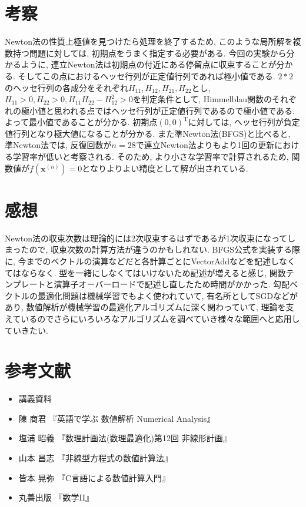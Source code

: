 \documentclass[12pt,a4paper]{jsarticle}
\begin{document}


\section{考察}
Newton法の性質上極値を見つけたら処理を終了するため, このような局所解を複数持つ問題に対しては, 初期点をうまく指定する必要がある. 今回の実験から分かるように, 連立Newton法は初期点の付近にある停留点に収束することが分かる. そしてこの点におけるヘッセ行列が正定値行列であれば極小値である. $2*2$のヘッセ行列の各成分をそれぞれ$H_{11}, H_{12}, H_{21}, H_{22}$とし, $H_{11} > 0, H_{22} > 0, H_{11}H_{22} - H_{12}^2 > 0$を判定条件として, Himmelblau関数のそれぞれの極小値と思われる点ではヘッセ行列が正定値行列であるので極小値である. よって最小値であることが分かる. 初期点$(0, 0)^{\mathrm{T}}$に対しては, ヘッセ行列が負定値行列となり極大値になることが分かる. また準Newton法(BFGS)と比べると, 準Newton法では, 反復回数が$n=28$で連立Newton法よりもより1回の更新における学習率が低いと考察される. そのため, より小さな学習率で計算されるため, 関数値が$f(\bm{x}^{(n)}) = 0$となりよりよい精度として解が出されている.


\section{感想}
Newton法の収束次数は理論的には2次収束するはずであるが1次収束になってしまったので, 収束次数の計算方法が違うのかもしれない.
BFGS公式を実装する際に, 今までのベクトルの演算などだと各計算ごとにVectorAddなどを記述しなくてはならなく. 型を一緒にしなくてはいけないため記述が増えると感じ, 関数テンプレートと演算子オーバーロードで記述し直したため時間がかかった.
勾配ベクトルの最適化問題は機械学習でもよく使われていて, 有名所としてSGDなどがあり, 数値解析が機械学習の最適化アルゴリズムに深く関わっていて, 理論を支えているのでさらにいろいろなアルゴリズムを調べていき様々な範囲へと応用していきたい.

\section{参考文献}
\begin{itemize}
\item 講義資料
\item 陳 商君 『英語で学ぶ 数値解析 Numerical Analysis』
\item 塩浦 昭義 『数理計画法(数理最適化)第12回 非線形計画』
\item 山本 昌志 『非線型方程式の数値計算法』
\item 皆本 晃弥 『C言語による数値計算入門』
\item 丸善出版 『数学I\hspace{-.1em}I』
\end{itemize}
\end{document}
